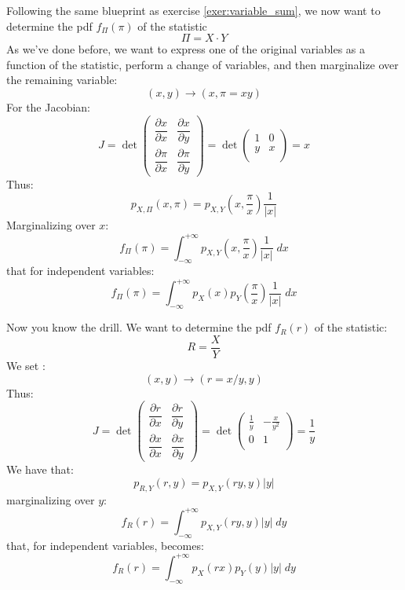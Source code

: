 \clearpage
\begin{exercise}
	Following the same blueprint as exercise \ref{exer:variable_sum}, we now want to determine the pdf
	$f_{\Pi}(\pi)$ of the statistic
	\[
	\Pi = X \cdot Y
	\]
	As we've done before, we want to express one of the original variables as a function
	of the statistic, perform a change of variables, and then marginalize over
	the remaining variable:
	\[
	(x,y)\longrightarrow (x,\pi=xy)
	\]
	For the Jacobian:
	\[
		J = \det 	\begin{pmatrix}
			\dfrac{\partial x}{\partial x} &
			\dfrac{\partial x}{\partial y}
			\\[1em]
			\dfrac{\partial \pi}{\partial x} &
			\dfrac{\partial \pi}{\partial y}
		\end{pmatrix} = \det \begin{pmatrix}
		1 & 0\\
		y & x \\
		\end{pmatrix}=x
	\]
	Thus:
	\[
		p_{X, \Pi}(x, \pi)=p_{X, Y}\left(x, \frac{\pi}{x}\right)\frac{1}{\left|x\right|}
	\]
	Marginalizing over $x$:
	\[
		f_{\Pi}(\pi)=\int_{-\infty}^{+\infty}p_{X, Y}\left(x, \frac{\pi}{x}\right)\frac{1}{\left|x\right|}\; dx
	\]
	that for independent variables:
	\[
		f_{\Pi}(\pi)=\int_{-\infty}^{+\infty}p_{X}(x)p_{Y}\left(\frac{\pi}{x}\right)\frac{1}{\left|x\right|}\; dx
	\]
\end{exercise}

\clearpage
\begin{exercise}
	Now you know the drill. We want to determine the pdf $f_{R}(r)$ of the statistic:
	\[
		R=\frac{X}{Y}
	\]
	We set \sidenotemark:
	\[
		(x,y)\longrightarrow (r=x/y,y)
	\]
	Thus:
	\[
	J = \det 	\begin{pmatrix}
		\dfrac{\partial r}{\partial x} &
		\dfrac{\partial r}{\partial y}
		\\[1em]
		\dfrac{\partial x}{\partial x} &
		\dfrac{\partial x}{\partial y}
	\end{pmatrix} = \det \begin{pmatrix}
		\frac{1}{y} & -\frac{x}{y^2}\\
		0 & 1\\
	\end{pmatrix}=\frac{1}{y}
	\]
	We have that:
	\[
		p_{R, Y}(r,y)=p_{X,Y}(ry,y)|y|
	\]
	marginalizing over $y$:
	\[
		f_R(r)=\int_{-\infty}^{+\infty}p_{X,Y}(ry,y)|y|\;dy
	\]
	that, for independent variables, becomes:
	\[
		f_R(r)=\int_{-\infty}^{+\infty}p_X(rx)p_Y(y)|y|\;dy
	\]
\end{exercise}

